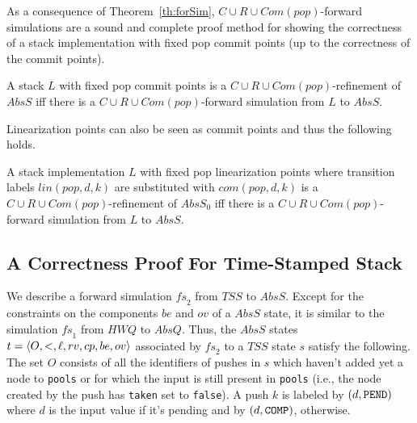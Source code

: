 
As a consequence of Theorem~\ref{th:forSim}, $C\cup R\cup Com(pop)$-forward simulations are a sound and complete proof method for showing the correctness of a stack implementation with fixed pop commit points (up to the correctness of the commit points).


\vspace{-1.5mm}
\begin{corollary}
A stack $L$ with fixed pop commit points is a $C\cup R\cup Com(pop)$-refinement of $AbsS$ if{f} there is a $C\cup R\cup Com(pop)$-forward simulation from $L$ to $AbsS$.
\vspace{-1.5mm}
\end{corollary}

Linearization points can also be seen as commit points and thus the following holds.

\vspace{-1.5mm}
\begin{corollary}
A stack implementation $L$ with fixed pop linearization points where transition labels $lin(pop,d,k)$ are substituted with $com(pop,d,k)$ is a $C\cup R\cup Com(pop)$-refinement of $AbsS_0$ if{f} there is a $C\cup R\cup Com(pop)$-forward simulation from $L$ to $AbsS$.
\vspace{-1.5mm}
\end{corollary}


\vspace{-6mm}
\subsection{A Correctness Proof For Time-Stamped Stack}\label{sec:corr_tss}
\vspace{-1mm}
We describe a forward simulation $\mathit{fs}_2$ from $\mathit{TSS}$ to $AbsS$. Except for the constraints on the components $be$ and $ov$ of a $AbsS$ state, it is similar to the simulation $\mathit{fs}_1$ from $\mathit{HWQ}$ to $AbsQ$. Thus, the $AbsS$ states $t=\langle {O,<,\ell,rv,cp,be,ov} \rangle$ associated by $\mathit{fs}_2$ to a $\mathit{TSS}$ state $s$ satisfy the following. The set $O$ consists of all the identifiers of pushes in $s$ which haven't added yet a node to {\tt pools} or for which the input is still present in {\tt pools} (i.e., the node created by the push has {\tt taken} set to {\tt false}). A push $k$ is labeled by $(d,{\tt PEND})$ where $d$ is the input value if it's pending and by $(d,{\tt COMP})$, otherwise.

